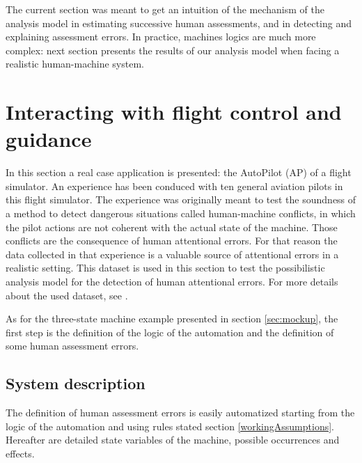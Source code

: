 The current section was meant to get an intuition of the mechanism
of the analysis model in estimating successive human assessments,
and in detecting and explaining assessment errors. 
In practice, machines logics are much more complex: 
next section presents the results of our analysis model
when facing a realistic human-machine system.

\section{Interacting with flight control and guidance}

\label{sec:flightSim}
In this section a real case application is presented: 
the AutoPilot (AP) of a flight simulator. 
An experience has been conduced with ten general aviation pilots 
in this flight simulator. 
The experience was originally meant to test the soundness 
of a method to detect dangerous situations 
called human-machine conflicts, 
in which the pilot actions are not coherent 
with the actual state of the machine. 
Those conflicts are the consequence 
of human attentional errors. 
For that reason the data collected 
in that experience is a valuable source of attentional errors 
in a realistic setting. 
This dataset is used in this section 
to test the possibilistic analysis model 
for the detection of human attentional errors.
For more details about the used dataset, 
see \cite{pizziol14}.

As for the three-state machine example presented in section \ref{sec:mockup}, 
the first step is the definition of the logic of the automation 
and the definition of some human assessment errors.

\subsection{System description}
The definition of human assessment errors 
is easily automatized starting from the logic of the automation 
and using rules stated section \ref{workingAssumptions}. 
Hereafter are detailed state variables of the machine, 
possible occurrences and effects.


